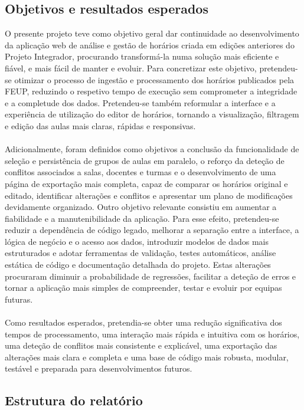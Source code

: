 \documentclass[10pt]{article}
\begin{document}
	\subsection{Objetivos e resultados esperados}
    \label{sec:objetivos}

    O presente projeto teve como objetivo geral dar continuidade ao desenvolvimento da aplicação web de análise e gestão de horários criada em edições anteriores do Projeto Integrador, procurando transformá-la numa solução mais eficiente e fiável, e mais fácil de manter e evoluir.
    Para concretizar este objetivo, pretendeu-se otimizar o processo de ingestão e processamento dos horários publicados pela FEUP, reduzindo o respetivo tempo de execução sem comprometer a integridade e a completude dos dados. Pretendeu-se também reformular a interface e a experiência de utilização do editor de horários, tornando a visualização, filtragem e edição das aulas mais claras, rápidas e responsivas.\\
    \\
    Adicionalmente, foram definidos como objetivos a conclusão da funcionalidade de seleção e persistência de grupos de aulas em paralelo, o reforço da deteção de conflitos associados a salas, docentes e turmas e o desenvolvimento de uma página de exportação mais completa, capaz de comparar os horários original e editado, identificar alterações e conflitos e apresentar um plano de modificações devidamente organizado.
    Outro objetivo relevante consistiu em aumentar a fiabilidade e a manutenibilidade da aplicação. Para esse efeito, pretendeu-se reduzir a dependência de código legado, melhorar a separação entre a interface, a lógica de negócio e o acesso aos dados, introduzir modelos de dados mais estruturados e adotar ferramentas de validação, testes automáticos, análise estática de código e documentação detalhada do projeto. Estas alterações procuraram diminuir a probabilidade de regressões, facilitar a deteção de erros e tornar a aplicação mais simples de compreender, testar e evoluir por equipas futuras.\\
    \\
    Como resultados esperados, pretendia-se obter uma redução significativa dos tempos de processamento, uma interação mais rápida e intuitiva com os horários, uma deteção de conflitos mais consistente e explicável, uma exportação das alterações mais clara e completa e uma base de código mais robusta, modular, testável e preparada para desenvolvimentos futuros.

    
	\subsection{Estrutura do relatório}
	
\end{document}
